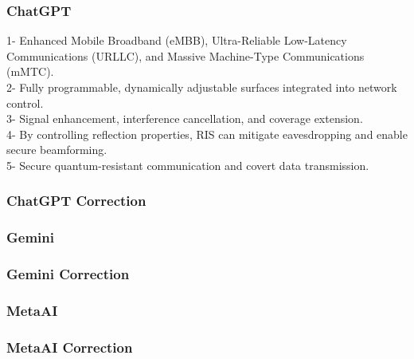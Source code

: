 \subsubsection{ChatGPT}
\begin{tcolorbox}[breakable]
    1- Enhanced Mobile Broadband (eMBB), Ultra-Reliable Low-Latency Communications (URLLC), and Massive Machine-Type Communications (mMTC).\\
2- Fully programmable, dynamically adjustable surfaces integrated into network control.\\
3- Signal enhancement, interference cancellation, and coverage extension.\\
4- By controlling reflection properties, RIS can mitigate eavesdropping and enable secure beamforming.\\
5- Secure quantum-resistant communication and covert data transmission.\\

\end{tcolorbox}
\subsubsection{ChatGPT Correction}
\begin{tcolorbox}[breakable]
    
\end{tcolorbox}
\subsubsection{Gemini}
\begin{tcolorbox}[breakable]
    
\end{tcolorbox}
\subsubsection{Gemini Correction}
\begin{tcolorbox}[breakable]
    
\end{tcolorbox}
\subsubsection{MetaAI}
\begin{tcolorbox}[breakable]
    
\end{tcolorbox}
\subsubsection{MetaAI Correction}
\begin{tcolorbox}[breakable]
    
\end{tcolorbox}


